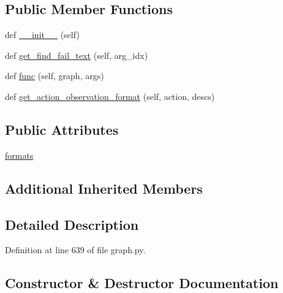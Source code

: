 \subsection*{Public Member Functions}
\begin{DoxyCompactItemize}
\item 
def \hyperlink{classlight__chats_1_1graph_1_1UseFunction_a4a49f4428084f1be52388a47f31bdd19}{\+\_\+\+\_\+init\+\_\+\+\_\+} (self)
\item 
def \hyperlink{classlight__chats_1_1graph_1_1UseFunction_a44e9ef0d0d915c32926944fd4da8e332}{get\+\_\+find\+\_\+fail\+\_\+text} (self, arg\+\_\+idx)
\item 
def \hyperlink{classlight__chats_1_1graph_1_1UseFunction_a75a1cb4d8d51f0336a3d5cd9f005e266}{func} (self, graph, args)
\item 
def \hyperlink{classlight__chats_1_1graph_1_1UseFunction_ae9056a0aa6e94b1d11be472b2549b2c2}{get\+\_\+action\+\_\+observation\+\_\+format} (self, action, descs)
\end{DoxyCompactItemize}
\subsection*{Public Attributes}
\begin{DoxyCompactItemize}
\item 
\hyperlink{classlight__chats_1_1graph_1_1UseFunction_ab5894266d221cc0d34b1e653b4bafc2d}{formats}
\end{DoxyCompactItemize}
\subsection*{Additional Inherited Members}


\subsection{Detailed Description}


Definition at line 639 of file graph.\+py.



\subsection{Constructor \& Destructor Documentation}
\mbox{\label{classlight__chats_1_1graph_1_1UseFunction_a4a49f4428084f1be52388a47f31bdd19}} 
